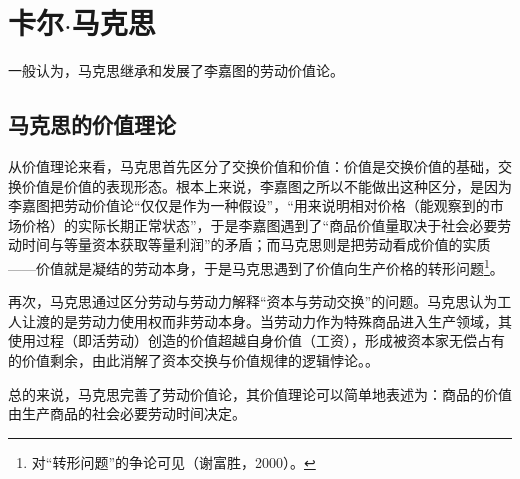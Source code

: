 \section{卡尔$\cdot$马克思}

一般认为，马克思继承和发展了李嘉图的劳动价值论\cite[347]{YueSeFu*XiongBiTeJingJiFenXiShiDi2Juan2017}\cite[84]{ChenDaiSunCongGuDianJingJiXuePaiDaoMaKeSiRuoGanZhuYaoXueShuoFaZhanLueLun2014}。

\subsection{马克思的价值理论}

从价值理论来看，马克思首先区分了交换价值和价值：价值是交换价值的基础，交换价值是价值的表现形态\cite[86-88]{ChenDaiSunCongGuDianJingJiXuePaiDaoMaKeSiRuoGanZhuYaoXueShuoFaZhanLueLun2014}。根本上来说，李嘉图之所以不能做出这种区分，是因为李嘉图把劳动价值论“仅仅是作为一种假设”，“用来说明相对价格（能观察到的市场价格）的实际长期正常状态”\cite[348]{YueSeFu*XiongBiTeJingJiFenXiShiDi2Juan2017}，于是李嘉图遇到了“商品价值量取决于社会必要劳动时间与等量资本获取等量利润”的矛盾\cite[144]{CaiJiMingCongGuDianZhengZhiJingJiXueDaoZhongGuoTeSeSheHuiZhuYiZhengZhiJingJiXueJiYuZhongGuoShiJiaoDeZhengZhiJingJiXueYanBianShangCe2023}\cite[21-28]{DaWei*LiJiaTuZhengZhiJingJiXueJiFuShuiYuanLi2021}；而马克思则是把劳动看成价值的实质——价值就是凝结的劳动本身，于是马克思遇到了价值向生产价格的转形问题\footnote{对“转形问题”的争论可见（谢富胜，2000）\cite{XieFuShengXiFangXueZheGuanYuMaKeSiJieZhiZhuanXingLiLunYanJiuShuPing2000}。}\cite[348-350]{YueSeFu*XiongBiTeJingJiFenXiShiDi2Juan2017}\cite[159]{CaiJiMingCongGuDianZhengZhiJingJiXueDaoZhongGuoTeSeSheHuiZhuYiZhengZhiJingJiXueJiYuZhongGuoShiJiaoDeZhengZhiJingJiXueYanBianShangCe2023}。

再次，马克思通过区分劳动与劳动力解释“资本与劳动交换”的问题。马克思认为工人让渡的是劳动力使用权而非劳动本身。当劳动力作为特殊商品进入生产领域，其使用过程（即活劳动）创造的价值超越自身价值（工资），形成被资本家无偿占有的价值剩余，由此消解了资本交换与价值规律的逻辑悖论。\cite[615,581-606]{ZhongGongZhongYangMaKeSiEnGeSiLieNingSiDaLinZhuZuoBianYiJuMaKeSiEnGeSiWenJiDi5Juan2009}\cite[157-158]{CaiJiMingCongGuDianZhengZhiJingJiXueDaoZhongGuoTeSeSheHuiZhuYiZhengZhiJingJiXueJiYuZhongGuoShiJiaoDeZhengZhiJingJiXueYanBianShangCe2023}\cite[348]{YueSeFu*XiongBiTeJingJiFenXiShiDi2Juan2017}。

总的来说，马克思完善了劳动价值论，其价值理论可以简单地表述为：商品的价值由生产商品的社会必要劳动时间决定\cite[51-52]{ZhongGongZhongYangMaKeSiEnGeSiLieNingSiDaLinZhuZuoBianYiJuMaKeSiEnGeSiWenJiDi5Juan2009}。

